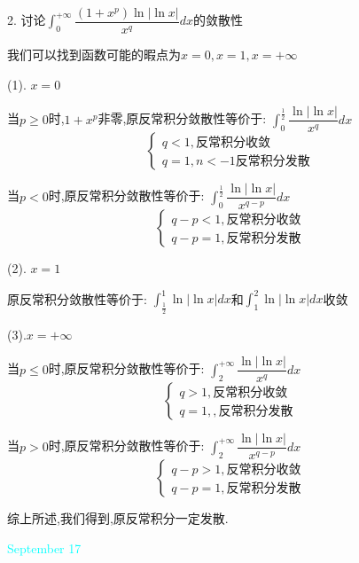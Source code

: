 2. 讨论$\int_{0}^{+\infty}\dfrac{(1+x^p)\ln|\ln x|}{x^q}dx$的敛散性
\begin{solution}

	我们可以找到函数可能的暇点为$x=0,x=1,x=+\infty$
	
	(1). $x=0$
	
	当$p\geq 0$时,$1+x^{p}$非零,原反常积分敛散性等价于:  $\int_{0}^{\frac{1}{2}}\dfrac{\ln|\ln x|}{x^q}dx$
	$$\left\lbrace
	\begin{array}{l}
		q<1,\text{反常积分收敛}\\
		q=1,n<-1\text{反常积分发散}
	\end{array}
	\right. $$
	
	当$p<0$时,原反常积分敛散性等价于:  $\int_{0}^{\frac{1}{2}}\dfrac{\ln|\ln x|}{x^{q-p}}dx$
	$$\left\lbrace
	\begin{array}{l}
		q-p<1,\text{反常积分收敛}\\
		q-p=1,\text{反常积分发散}
	\end{array}
	\right. $$
	
	(2). $x=1$
	
	原反常积分敛散性等价于:  $\int_{\frac{1}{2}}^{1}\ln|\ln x|dx$和$\int_{1}^{2}\ln|\ln x|dx$收敛
	
	(3).$x=+\infty$
	
	当$p\leq 0$时,原反常积分敛散性等价于:  $\int_{2}^{+\infty}\dfrac{\ln|\ln x|}{x^q}dx$
	$$\left\lbrace
	\begin{array}{l}
		q>1,\text{反常积分收敛}\\
		q=1,,\text{反常积分发散}
	\end{array}
	\right. $$
	
	当$p>0$时,原反常积分敛散性等价于:  $\int_{2}^{+\infty}\dfrac{\ln|\ln x|}{x^{q-p}}dx$
	$$\left\lbrace
	\begin{array}{l}
		q-p>1,\text{反常积分收敛}\\
		q-p=1,\text{反常积分发散}
	\end{array}
	\right. $$
	
	综上所述,我们得到,原反常积分一定发散.
	
\end{solution}

\textcolor{cyan}{September 17}

